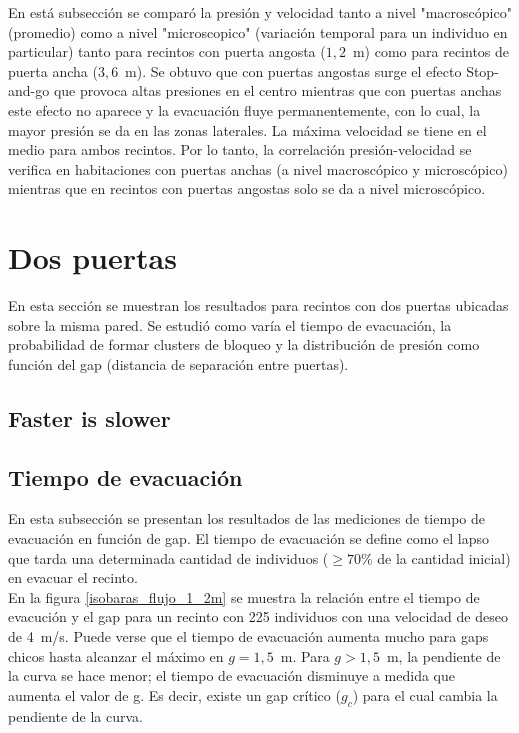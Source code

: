 En está subsección se comparó la presión y velocidad tanto a nivel "macroscópico" (promedio) como a nivel "microscopico" (variación temporal para un individuo en particular) tanto para recintos con puerta angosta ($1,2$~m) como para recintos de puerta ancha ($3,6$~m). Se obtuvo que con puertas angostas surge el efecto Stop-and-go que provoca altas presiones en el centro mientras que con puertas anchas este efecto no aparece y la evacuación fluye permanentemente, con lo cual, la mayor presión se da en las zonas laterales. La máxima velocidad se tiene en el medio para ambos recintos. Por lo tanto, la correlación presión-velocidad se verifica en habitaciones con puertas anchas (a nivel macroscópico y microscópico) mientras que en recintos con puertas angostas solo se da a nivel microscópico.  


\section{Dos puertas}

En esta sección se muestran los resultados para recintos con dos puertas ubicadas sobre la misma pared. Se estudió como varía el tiempo de evacuación, la probabilidad de formar clusters de bloqueo y la distribución de presión como función del gap (distancia de separación entre puertas).  

\subsection{Faster is slower}


\subsection{Tiempo de evacuación}

En esta subsección se presentan los resultados de las mediciones de tiempo de evacuación en función de gap.
El tiempo de evacuación se define como el lapso que tarda una determinada cantidad de individuos ($\ge70\%$ de la cantidad inicial) en evacuar el recinto. \\

En la figura \ref{isobaras_flujo_1_2m} se muestra la relación entre el tiempo de evacución y el gap para un recinto con 225 individuos con una velocidad de deseo de 4~m/s. Puede verse que el tiempo de evacuación aumenta mucho para gaps chicos hasta alcanzar el máximo en $g=1,5$~m. Para $g>1,5$~m, la pendiente de la curva se hace menor; el tiempo de evacuación disminuye a medida que aumenta el valor de g. 
Es decir, existe un gap crítico ($g_c$) para el cual cambia la pendiente de la curva.

